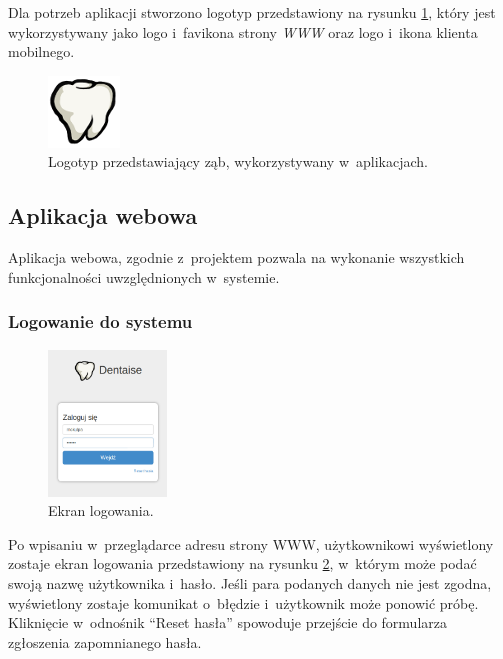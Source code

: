 \documentclass[11pt]{aghdpl}
\begin{document}
Dla potrzeb aplikacji stworzono logotyp przedstawiony na rysunku \ref{fig:logo}, który jest wykorzystywany jako logo i~favikona strony \emph{WWW} oraz logo i~ikona klienta mobilnego.

\begin{figure}[h!]
	\centering
	\includegraphics{logo}
	\caption{Logotyp przedstawiający ząb, wykorzystywany w~aplikacjach.}
	\label{fig:logo}
\end{figure}

\subsection{Aplikacja webowa}

Aplikacja webowa, zgodnie z~projektem pozwala na wykonanie wszystkich funkcjonalności uwzględnionych w~systemie.

\subsubsection{Logowanie do systemu}

\begin{figure}
	\begin{center}
		\includegraphics[width=0.28\textwidth]{logowanie}
	\end{center}
	\caption{Ekran logowania.}
	\label{fig:logowanie}
\end{figure}

Po wpisaniu w~przeglądarce adresu strony WWW, użytkownikowi wyświetlony zostaje ekran logowania przedstawiony na rysunku \ref{fig:logowanie}, w~którym może podać swoją nazwę użytkownika i~hasło. Jeśli para podanych danych nie jest zgodna, wyświetlony zostaje komunikat o~błędzie i~użytkownik może ponowić próbę. Kliknięcie w~odnośnik ``Reset hasła'' spowoduje przejście do formularza zgłoszenia zapomnianego hasła.
\end{document}
